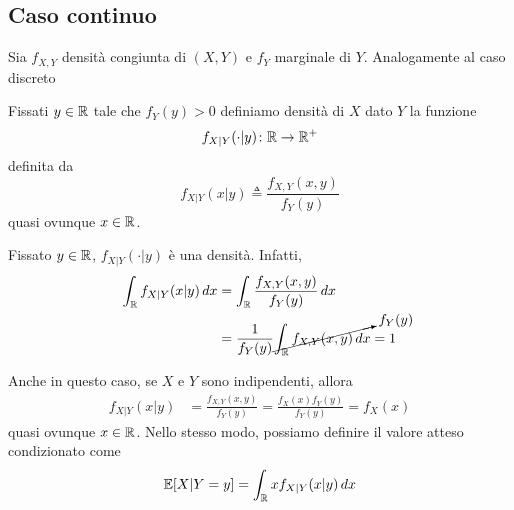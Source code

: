 \documentclass[a4paper]{article}
\begin{document}
\subsection{Caso continuo}

Sia \(f_{X,Y}\) densità congiunta di \((X,Y)\) e \(f_Y\) marginale di \(Y\).
Analogamente al caso discreto

\begin{snippetdefinition}{}
    Fissati \(y \in \mathbb{R}\) tale che \(f_Y(y) > 0\) definiamo
    densità di \(X\) dato \(Y\) la funzione
    \[
        f_{X|Y}(\cdot | y)\colon \mathbb{R} \to \mathbb{R}^+
    \]
    definita da
    \[
        f_{X|Y}(x|y) \triangleq \frac{f_{X,Y}(x,y)}{f_Y(y)}
    \]
    quasi ovunque \(x \in \mathbb{R}\).
\end{snippetdefinition}

Fissato \(y \in \mathbb{R}\), \(f_{X|Y}(\cdot|y)\) è una densità.
Infatti,
\begin{align*}
    \int_{\mathbb{R}} f_{X|Y}(x|y)\,dx
    &= \int_{\mathbb{R}} \frac{f_{X,Y}(x,y)}{f_Y(y)}\,dx \\
    &= \frac{1}{f_Y(y)} \cancelto{f_Y(y)}{
        \int_{\mathbb{R}} f_{X,Y}(x,y)\,dx
    } = 1
\end{align*}

Anche in questo caso, se \(X\) e \(Y\) sono indipendenti, allora
\begin{align*}
    f_{X|Y}(x|y) &= \frac{f_{X,Y}(x,y)}{f_Y(y)} = \frac{f_X(x) f_Y(y)}{f_Y(y)}
    = f_X(x)
\end{align*}
quasi ovunque \(x \in \mathbb{R}\).
Nello stesso modo, possiamo definire il valore atteso condizionato come
\[
    \mathbb E[X|Y=y] = \int_{\mathbb{R}} xf_{X|Y}(x|y)\,dx
\]
\end{document}

